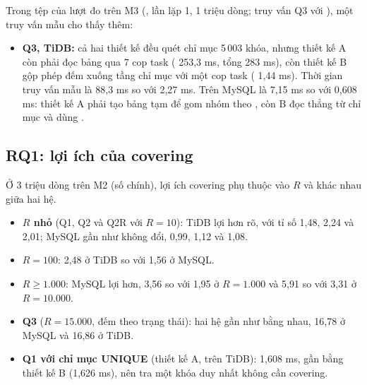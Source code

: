 

Trong tệp  của lượt đo trên M3 (, lần lặp 1, 1 triệu dòng; truy vấn Q3 với ), một truy vấn mẫu cho thấy thêm:
\begin{itemize}
  \item \textbf{Q3, TiDB:} cả hai thiết kế đều quét chỉ mục 5\,003 khóa, nhưng thiết kế A còn phải đọc bảng qua 7 cop task ( 253,3 ms, tổng  283 ms), còn thiết kế B gộp phép đếm xuống tầng chỉ mục với một cop task ( 1,44 ms). Thời gian truy vấn mẫu là 88,3 ms so với 2,27 ms. Trên MySQL là 7,15 ms so với 0,608 ms: thiết kế A phải tạo bảng tạm để gom nhóm theo , còn B đọc  thẳng từ chỉ mục và dùng .
\end{itemize}

\subsection{RQ1: lợi ích của covering}
Ở 3 triệu dòng trên M2 (số chính), lợi ích covering phụ thuộc vào $R$ và khác nhau giữa hai hệ.
\begin{itemize}
  \item \textbf{$R$ nhỏ} (Q1, Q2 và Q2R với $R = 10$): TiDB lợi hơn rõ, với tỉ số 1,48, 2,24 và 2,01; MySQL gần như không đổi, 0,99, 1,12 và 1,08.
  \item \textbf{$R = 100$}: 2,48 ở TiDB so với 1,56 ở MySQL.
  \item \textbf{$R \geq 1.000$}: MySQL lợi hơn, 3,56 so với 1,95 ở $R = 1.000$ và 5,91 so với 3,31 ở $R = 10.000$.
  \item \textbf{Q3} ($R = 15.000$, đếm theo trạng thái): hai hệ gần như bằng nhau, 16,78 ở MySQL và 16,86 ở TiDB.
  \item \textbf{Q1 với chỉ mục UNIQUE} (thiết kế A,  trên TiDB): 1,608 ms, gần bằng thiết kế B (1,626 ms), nên tra một khóa duy nhất không cần covering.
\end{itemize}

